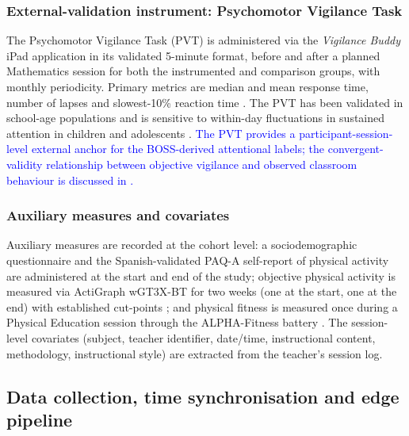 \subsubsection{External-validation instrument: Psychomotor Vigilance Task}

The Psychomotor Vigilance Task (PVT) is administered via the \emph{Vigilance Buddy} iPad application in its validated 5-minute format, before and after a planned Mathematics session for both the instrumented and comparison groups, with monthly periodicity. Primary metrics are median and mean response time, number of lapses and slowest-10\% reaction time \parencite{Dinges1985_pvt,Loh2004_pvt_short,Basner2011_pvt,Basner2018_pvt_practice}. The PVT has been validated in school-age populations and is sensitive to within-day fluctuations in sustained attention in children and adolescents \parencite{Barel2022_pvt_children,Barel2022_sleep_pvt,GonzalezFernandez2023_pvt_breaks}. \textcolor{blue}{The PVT provides a participant-session-level external anchor for the BOSS-derived attentional labels; the convergent-validity relationship between objective vigilance and observed classroom behaviour is discussed in .}

\subsubsection{Auxiliary measures and covariates}

Auxiliary measures are recorded at the cohort level: a sociodemographic questionnaire and the Spanish-validated PAQ-A self-report of physical activity \parencite{MartinezGomez2009_paq_a} are administered at the start and end of the study; objective physical activity is measured via ActiGraph wGT3X-BT for two weeks (one at the start, one at the end) with established cut-points \parencite{Evenson2008_actigraph}; and physical fitness is measured once during a Physical Education session through the ALPHA-Fitness battery \parencite{RuizFernandez2011_alpha}. The session-level covariates (subject, teacher identifier, date/time, instructional content, methodology, instructional style) are extracted from the teacher's session log.

\subsection{Data collection, time synchronisation and edge pipeline}\label{subsec:pipeline}

